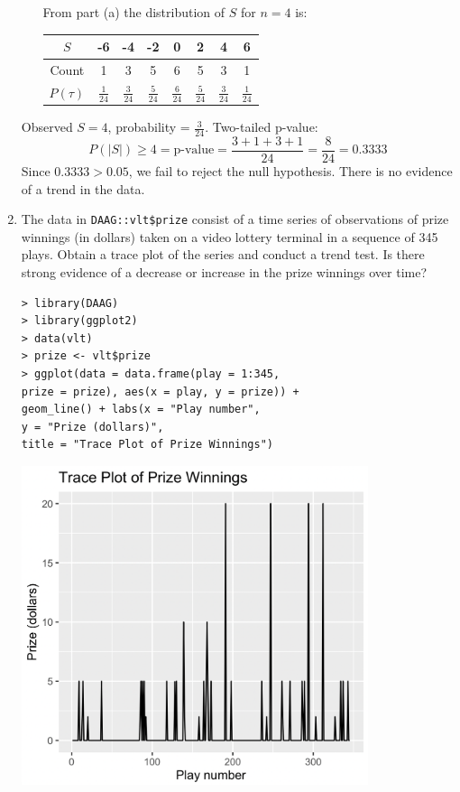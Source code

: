 \documentclass[12pt]{article}
\begin{document}
\begin{enumerate}
\begin{enumerate}
            From part (a) the distribution of $S$ for $n = 4$ is:

            \begin{table}[h]
                \centering
                \begin{tabular}{c c c c c c c c}
                    \hline
                    $S$ & -6 & -4 & -2 & 0 & 2 & 4 & 6 \\
                    \hline
                    Count & 1 & 3 & 5 & 6 & 5 & 3 & 1 \\
                    \hline
                    $P(\tau)$
                    &  $\frac{1}{24}$ & $\frac{3}{24}$ & $\frac{5}{24}$ & $\frac{6}{24}$ & $\frac{5}{24}$ & $\frac{3}{24}$ & $\frac{1}{24}$ \\
                    \hline
                \end{tabular}
            \end{table}
        \end{enumerate}
        Observed $S = 4$, probability = $\frac{3}{24}$. Two-tailed p-value: 
        \[P(|S|) \geq 4 =  \text{p-value} = \frac{3 + 1 + 3 + 1}{24} = \frac{8}{24} = 0.3333 \]
        Since $0.3333 > 0.05$, we fail to reject the null hypothesis. There is no evidence of a trend in the data.
    \item The data in \verb|DAAG::vlt$prize| consist of a time series of observations of prize
        winnings (in dollars) taken on a video lottery terminal in a sequence of 345 plays. Obtain
        a trace plot of the series and conduct a trend test. Is there strong evidence of a decrease
        or increase in the prize winnings over time?
    \begin{verbatim}
> library(DAAG)
> library(ggplot2)
> data(vlt)
> prize <- vlt$prize
> ggplot(data = data.frame(play = 1:345, 
prize = prize), aes(x = play, y = prize)) +
geom_line() + labs(x = "Play number", 
y = "Prize (dollars)", 
title = "Trace Plot of Prize Winnings")
    \end{verbatim}
    \begin{center}
        \includegraphics[width=0.8\textwidth]{traceplot.png}

\end{center}
\end{enumerate}
\end{document}
